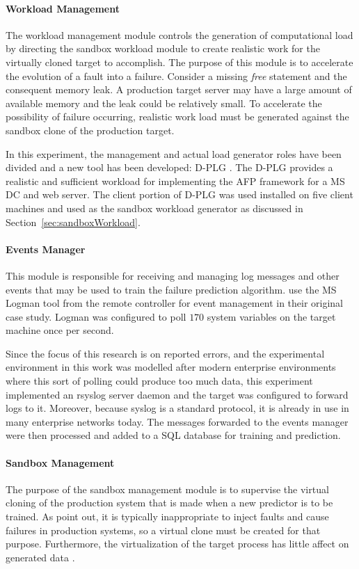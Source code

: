\paragraph{Workload Management} \label{sec:workloadMgr} 
The workload management module controls the generation of computational load by
directing the sandbox workload module to create realistic work for the
virtually cloned target to accomplish.  The purpose of this module is to
accelerate the evolution of a fault into a failure.  Consider a missing
\emph{free} statement and the consequent memory leak.  A production target
server may have a large amount of available memory and the leak could be
relatively small.  To accelerate the possibility of failure occurring,
realistic work load must be generated against the sandbox clone of the
production target.

In this experiment, the management and actual load generator roles have been
divided and a new tool has been developed: \ac{D-PLG} \citep{jordan2016}.  The
\ac{D-PLG} provides a realistic and sufficient workload for implementing the
\ac{AFP} framework for a \ac{MS} \ac{DC} and web server.  The client portion of
\ac{D-PLG} was used installed on five client machines and used as the sandbox
workload generator as discussed in Section~\ref{sec:sandboxWorkload}.

\paragraph{Events Manager} \label{sec:eventsManagerMgr}
This module is responsible for receiving and managing log messages and other
events that may be used to train the failure prediction algorithm.
\citet{irrera2015} use the \ac{MS} Logman tool from the remote controller for
event management in their original case study.  Logman was configured to poll
$170$ system variables on the target machine once per second.  

Since the focus of this research is on reported errors, and the experimental
environment in this work was modelled after modern enterprise environments
where this sort of polling could produce too much data, this experiment
implemented an rsyslog server daemon and the target was configured to forward
logs to it.  Moreover, because syslog is a standard protocol, it is already in
use in many enterprise networks today.  The messages forwarded to the events
manager were then processed and added to a \ac{SQL} database for training and
prediction.  

\paragraph{Sandbox Management} \label{sec:sandboxMgr} 
The purpose of the sandbox management module is to supervise the virtual
cloning of the production system that is made when a new predictor is to be
trained.  As \citet{irrera2013,irrera2015} point out, it is typically
inappropriate to inject faults and cause failures in production systems, so a
virtual clone must be created for that purpose.  Furthermore, the
virtualization of the target process has little affect on generated data
\citep{irrera2013}.

